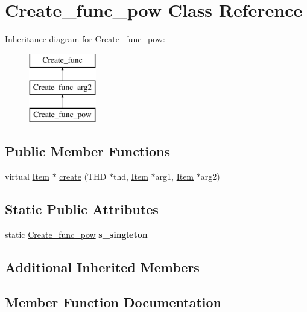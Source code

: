 \hypertarget{classCreate__func__pow}{}\section{Create\+\_\+func\+\_\+pow Class Reference}
\label{classCreate__func__pow}
Inheritance diagram for Create\+\_\+func\+\_\+pow\+:\begin{figure}[H]
\begin{center}
\leavevmode
\includegraphics[height=3.000000cm]{classCreate__func__pow}
\end{center}
\end{figure}
\subsection*{Public Member Functions}
\begin{DoxyCompactItemize}
\item 
virtual \mbox{\hyperlink{classItem}{Item}} $\ast$ \mbox{\hyperlink{classCreate__func__pow_a6ce4558204b8759b4f9e073b76d5a1f4}{create}} (T\+HD $\ast$thd, \mbox{\hyperlink{classItem}{Item}} $\ast$arg1, \mbox{\hyperlink{classItem}{Item}} $\ast$arg2)
\end{DoxyCompactItemize}
\subsection*{Static Public Attributes}
\begin{DoxyCompactItemize}
\item 
\mbox{\label{classCreate__func__pow_a1203b06b6991ca8733f7922a71822856}} 
static \mbox{\hyperlink{classCreate__func__pow}{Create\+\_\+func\+\_\+pow}} {\bfseries s\+\_\+singleton}
\end{DoxyCompactItemize}
\subsection*{Additional Inherited Members}


\subsection{Member Function Documentation}
\mbox{\label{classCreate__func__pow_a6ce4558204b8759b4f9e073b76d5a1f4}} 
